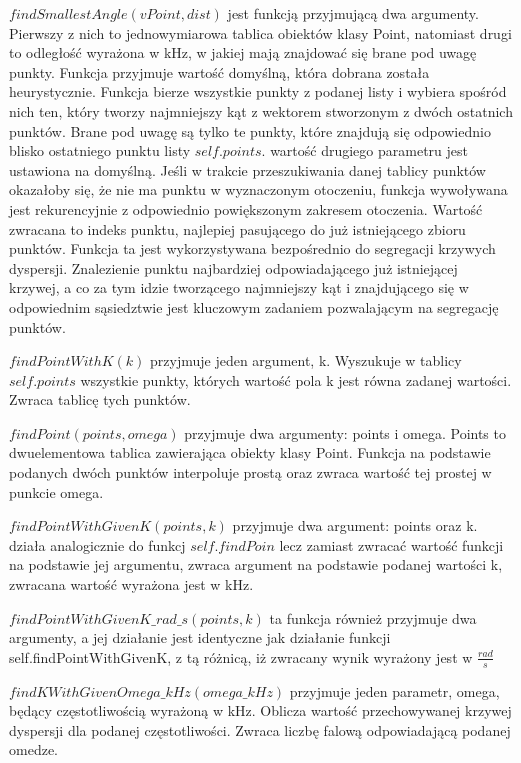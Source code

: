 $findSmallestAngle(vPoint, dist)$ jest funkcją przyjmującą dwa argumenty. Pierwszy z nich to jednowymiarowa tablica obiektów klasy Point, natomiast drugi to odległość wyrażona w kHz, w jakiej mają znajdować się brane pod uwagę punkty. Funkcja przyjmuje wartość domyślną, która dobrana została heurystycznie. Funkcja bierze wszystkie punkty z podanej listy i wybiera spośród nich ten, który tworzy najmniejszy kąt z wektorem stworzonym z dwóch ostatnich punktów. Brane pod uwagę są tylko te punkty, które znajdują się odpowiednio blisko ostatniego punktu listy $self.points$. wartość drugiego parametru jest ustawiona na domyślną. Jeśli w trakcie przeszukiwania danej tablicy punktów okazałoby się, że nie ma punktu w wyznaczonym otoczeniu, funkcja wywoływana jest rekurencyjnie z odpowiednio powiększonym zakresem otoczenia. Wartość zwracana to indeks punktu, najlepiej pasującego do już istniejącego zbioru punktów. Funkcja ta jest wykorzystywana bezpośrednio do segregacji krzywych dyspersji. Znalezienie punktu najbardziej odpowiadającego już istniejącej krzywej, a co za tym idzie tworzącego najmniejszy kąt i znajdującego się w odpowiednim sąsiedztwie jest kluczowym zadaniem pozwalającym na segregację punktów.

$findPointWithK(k)$ przyjmuje jeden argument, k. Wyszukuje w tablicy $self.points$ wszystkie punkty, których wartość pola k jest równa zadanej wartości. Zwraca tablicę tych punktów.

$findPoint(points, omega)$ przyjmuje dwa argumenty: points i omega. Points to dwuelementowa tablica zawierająca obiekty klasy Point. Funkcja na podstawie podanych dwóch punktów interpoluje prostą oraz zwraca wartość tej prostej w punkcie omega.

$findPointWithGivenK(points, k)$ przyjmuje dwa argument: points oraz k. działa analogicznie do funkcj $self.findPoin$ lecz zamiast zwracać wartość funkcji na podstawie jej argumentu, zwraca argument na podstawie podanej wartości k, zwracana wartość wyrażona jest w kHz.

$findPointWithGivenK\_rad\_s(points, k)$ ta funkcja również przyjmuje dwa argumenty, a jej działanie jest identyczne jak działanie funkcji self.findPointWithGivenK, z tą różnicą, iż zwracany wynik wyrażony jest w $\frac{rad}{s}$

$findKWithGivenOmega\_kHz(omega\_kHz)$ przyjmuje jeden parametr, omega, będący częstotliwością wyrażoną w kHz. Oblicza wartość przechowywanej krzywej dyspersji dla podanej częstotliwości. Zwraca liczbę falową odpowiadającą podanej omedze.


